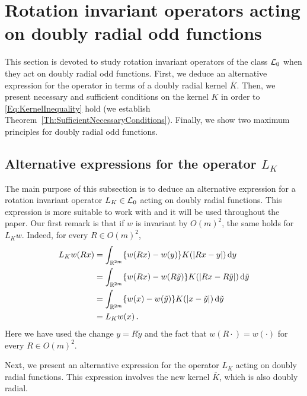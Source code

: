 \section{Rotation invariant operators acting on doubly radial odd functions}
\label{Sec:OperatorOddF}

This section is devoted to study rotation invariant operators of the class $\mathcal{L}_0$ when they act on doubly radial odd functions. First, we deduce an alternative expression for the operator in terms of a doubly radial kernel $\overline{K}$. Then, we present necessary and sufficient conditions on the kernel $K$ in order to \eqref{Eq:KernelInequality} hold (we establish Theorem~\ref{Th:SufficientNecessaryConditions}). Finally, we show two maximum principles for doubly radial odd functions.


\subsection{Alternative expressions for the operator $L_K$}

The main purpose of this subsection is to deduce an alternative expression for a rotation invariant operator $L_K \in \mathcal{L}_0$ acting on doubly radial functions. This expression is more suitable to work with and it will be used throughout the paper. Our first remark is that if $w$ is invariant by $O(m)^2$, the same holds for $L_Kw$. Indeed, for every $R \in O(m)^2$,
\begin{align*}
L_K w (Rx)
& = \int_{\mathbb{R}^{2m}} \{w(Rx) - w(y)\} K(|Rx - y|)  \,\mathrm{d} y\\
& = \int_{\mathbb{R}^{2m}} \{w(Rx) - w(R\tilde{y})\} K(|Rx - R\tilde{y}|) \,\mathrm{d} \tilde{y}\\
& = \int_{\mathbb{R}^{2m}} \{w(x) - w(\tilde{y})\} K(|x-\tilde{y}|) \,\mathrm{d} \tilde{y}\\
& = L_K w (x)\,.
\end{align*}
Here we have used the change $y = R\tilde{y}$ and the fact that $w(R \cdot) = w(\cdot)$ for every $R\in O(m)^2$.

Next, we present an alternative expression for the operator $L_K $ acting on doubly radial functions. This expression involves the new kernel $\overline{K}$, which is also doubly radial.

